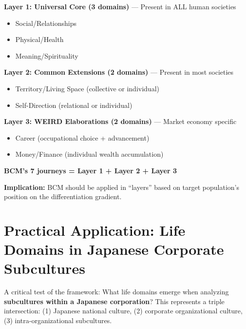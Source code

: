\begin{tcolorbox}[colback=gray!5!white, colframe=gray!75!black, title=Theoretical Model: Domain Emergence as Nested Layers]

\textbf{Layer 1: Universal Core (3 domains)} --- Present in ALL human societies
\begin{itemize}[nosep]
\item Social/Relationships
\item Physical/Health
\item Meaning/Spirituality
\end{itemize}

\textbf{Layer 2: Common Extensions (2 domains)} --- Present in most societies
\begin{itemize}[nosep]
\item Territory/Living Space (collective or individual)
\item Self-Direction (relational or individual)
\end{itemize}

\textbf{Layer 3: WEIRD Elaborations (2 domains)} --- Market economy specific
\begin{itemize}[nosep]
\item Career (occupational choice + advancement)
\item Money/Finance (individual wealth accumulation)
\end{itemize}

\textbf{BCM's 7 journeys = Layer 1 + Layer 2 + Layer 3}

\textbf{Implication:} BCM should be applied in ``layers'' based on target population's position on the differentiation gradient.

\end{tcolorbox}


\section{Practical Application: Life Domains in Japanese Corporate Subcultures}
\label{sec:bj-japan-corporate}

A critical test of the framework: What life domains emerge when analyzing \textbf{subcultures within a Japanese corporation}? This represents a triple intersection: (1) Japanese national culture, (2) corporate organizational culture, (3) intra-organizational subcultures.

